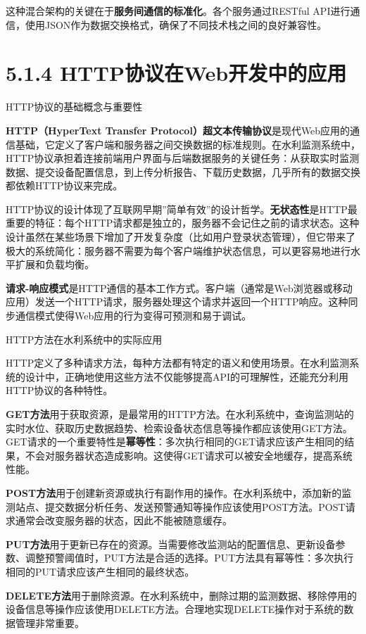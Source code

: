 这种混合架构的关键在于\textbf{服务间通信的标准化}。各个服务通过RESTful API进行通信，使用JSON作为数据交换格式，确保了不同技术栈之间的良好兼容性。

\section{5.1.4 HTTP协议在Web开发中的应用}

 HTTP协议的基础概念与重要性

\textbf{HTTP（HyperText Transfer Protocol）超文本传输协议}是现代Web应用的通信基础，它定义了客户端和服务器之间交换数据的标准规则。在水利监测系统中，HTTP协议承担着连接前端用户界面与后端数据服务的关键任务：从获取实时监测数据、提交设备配置信息，到上传分析报告、下载历史数据，几乎所有的数据交换都依赖HTTP协议来完成。

HTTP协议的设计体现了互联网早期''简单有效''的设计哲学。\textbf{无状态性}是HTTP最重要的特征：每个HTTP请求都是独立的，服务器不会记住之前的请求状态。这种设计虽然在某些场景下增加了开发复杂度（比如用户登录状态管理），但它带来了极大的系统简化：服务器不需要为每个客户端维护状态信息，可以更容易地进行水平扩展和负载均衡。

\textbf{请求-响应模式}是HTTP通信的基本工作方式。客户端（通常是Web浏览器或移动应用）发送一个HTTP请求，服务器处理这个请求并返回一个HTTP响应。这种同步通信模式使得Web应用的行为变得可预测和易于调试。

 HTTP方法在水利系统中的实际应用

HTTP定义了多种请求方法，每种方法都有特定的语义和使用场景。在水利监测系统的设计中，正确地使用这些方法不仅能够提高API的可理解性，还能充分利用HTTP协议的各种特性。

\textbf{GET方法}用于获取资源，是最常用的HTTP方法。在水利系统中，查询监测站的实时水位、获取历史数据趋势、检索设备状态信息等操作都应该使用GET方法。GET请求的一个重要特性是\textbf{幂等性}：多次执行相同的GET请求应该产生相同的结果，不会对服务器状态造成影响。这使得GET请求可以被安全地缓存，提高系统性能。

\textbf{POST方法}用于创建新资源或执行有副作用的操作。在水利系统中，添加新的监测站点、提交数据分析任务、发送预警通知等操作应该使用POST方法。POST请求通常会改变服务器的状态，因此不能被随意缓存。

\textbf{PUT方法}用于更新已存在的资源。当需要修改监测站的配置信息、更新设备参数、调整预警阈值时，PUT方法是合适的选择。PUT方法具有幂等性：多次执行相同的PUT请求应该产生相同的最终状态。

\textbf{DELETE方法}用于删除资源。在水利系统中，删除过期的监测数据、移除停用的设备信息等操作应该使用DELETE方法。合理地实现DELETE操作对于系统的数据管理非常重要。

